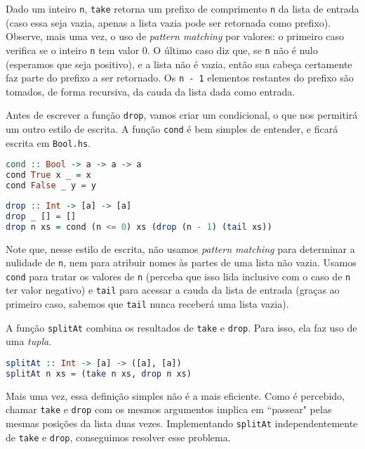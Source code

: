 \documentclass[a4paper]{article}
\begin{document}
Dado um inteiro \texttt{n}, \texttt{take} retorna um prefixo de comprimento \texttt{n} da lista de entrada (caso essa seja vazia, apenas a lista vazia pode ser retornada como prefixo).
Observe, mais uma vez, o uso de \emph{pattern matching} por valores: o primeiro caso verifica se o inteiro \texttt{n} tem valor 0.
O último caso diz que, se \texttt{n} não é nulo (esperamos que seja positivo), e a lista não é vazia, então sua cabeça certamente faz parte do prefixo a ser retornado. Os \texttt{n - 1} elementos restantes do prefixo são tomados, de forma recursiva, da cauda da lista dada como entrada.

Antes de escrever a função \texttt{drop}, vamos criar um condicional, o que nos permitirá um outro estilo de escrita.
A função \texttt{cond} é bem simples de entender, e ficará escrita em \texttt{Bool.hs}.

\begin{lstlisting}[language=haskell, frame=single]
cond :: Bool -> a -> a -> a
cond True x _ = x
cond False _ y = y
\end{lstlisting}

\begin{lstlisting}[language=haskell, frame=single]
drop :: Int -> [a] -> [a]
drop _ [] = []
drop n xs = cond (n <= 0) xs (drop (n - 1) (tail xs))
\end{lstlisting}

Note que, nesse estilo de escrita, não usamos \emph{pattern matching} para determinar a nulidade de \texttt{n}, nem para atribuir nomes às partes de uma lista não vazia.
Usamos \texttt{cond} para tratar os valores de \texttt{n} (perceba que isso lida inclusive com o caso de \texttt{n} ter valor negativo) e \texttt{tail} para acessar a cauda da lista de entrada (graças ao primeiro caso, sabemos que \texttt{tail} nunca receberá uma lista vazia).

A função \texttt{splitAt} combina os resultados de \texttt{take} e \texttt{drop}. Para isso, ela faz uso de uma \emph{tupla}.

\begin{lstlisting}[language=haskell, frame=single]
splitAt :: Int -> [a] -> ([a], [a])
splitAt n xs = (take n xs, drop n xs)
\end{lstlisting}

Mais uma vez, essa definição simples não é a mais eficiente.
Como é percebido, chamar \texttt{take} e \texttt{drop} com os mesmos argumentos implica em ``passear" pelas mesmas posições da lista duas vezes.
Implementando \texttt{splitAt} independentemente de \texttt{take} e \texttt{drop}, conseguimos resolver esse problema.
\end{document}
